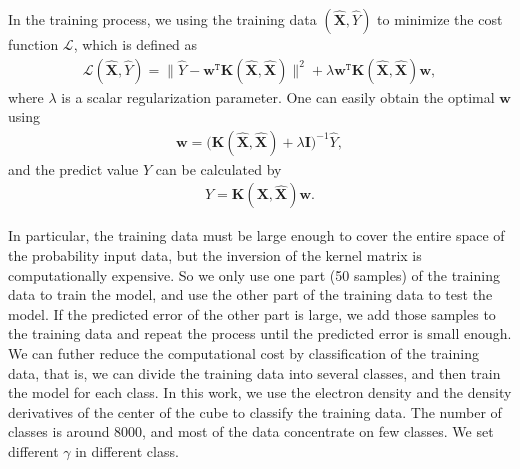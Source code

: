 \documentclass[%
twocolumn,
amsmath,amssymb,
groupedaddress,
reprint,%
]{revtex4-2}
\renewcommand{\>}{\rangle}
\newcommand{\<}{\langle}
\begin{document}
In the training process, we using the training data $(\bm{\widehat{X}}, \widehat{Y})$ to minimize the cost function $\mathcal{L}$, which is defined as
\begin{align}
	\label{eq:KRR_cost}
	\mathcal{L}(\bm{\widehat{X}}, \widehat{Y}) = \big\|\widehat{Y} - \bm{w}^{\mathtt{T}} \bm{K}(\bm{\widehat{X}}, \bm{\widehat{X}}) \big\|^{2} + \lambda \bm{w}^{\mathtt{T}} \bm{K}(\bm{\widehat{X}}, \bm{\widehat{X}}) \bm{w},
\end{align}
where $\lambda$ is a scalar regularization parameter.
% 
One can easily obtain the optimal $\bm{w}$ using
\begin{align}
	\label{eq:KRR_w}
	\bm{w} = \big(\bm{K}(\bm{\widehat{X}}, \bm{\widehat{X}}) + \lambda \bm{I}\big)^{-1} \widehat{Y},
\end{align}
and the predict value $Y$ can be calculated by
\begin{align}
	\label{eq:KRR_Y}
	Y = \bm{K}(\bm{X}, \bm{\widehat{X}}) \bm{w}.
\end{align}

In particular, the training data must be large enough to cover the entire space of the probability input data, but the inversion of the kernel matrix is computationally expensive.
% 
So we only use one part (50 samples) of the training data to train the model, and use the other part of the training data to test the model. If the predicted error of the other part is large, we add those samples to the training data and repeat the process until the predicted error is small enough.
% 
We can futher reduce the computational cost by classification of the training data, that is, we can divide the training data into several classes, and then train the model for each class.
In this work, we use the electron density and the density derivatives of the center of the cube to classify the training data.
%
The number of classes is around $8000$, and most of the data concentrate on few classes.
% 
We set different $\gamma$ in different class.
\end{document}

